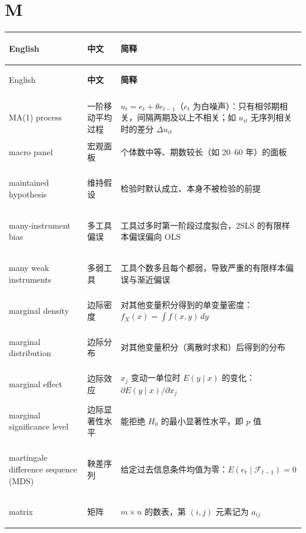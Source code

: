 \begingroup
\footnotesize
\setlength{\LTpre}{2pt}\setlength{\LTpost}{4pt}
\renewcommand{\arraystretch}{1.1}

\par{}\ifdim\dimexpr\pagegoal-\pagetotal\relax<16\baselineskip\newpage\fi
\section*{M}
\begin{longtable}{@{}>{\bfseries\boldmath\raggedright\arraybackslash}p{4.6cm}>{\raggedright\arraybackslash}p{3.2cm}>{\raggedright\arraybackslash}p{\dimexpr\textwidth-7.8cm-4\tabcolsep\relax}@{}}
\toprule
English & \textbf{中文} & \textbf{简释}\\
\midrule
\endfirsthead
\toprule
English & \textbf{中文} & \textbf{简释}\\
\midrule
\endhead
\midrule
\multicolumn{3}{r@{}}{\footnotesize\itshape （续下页）}\\
\endfoot
\bottomrule
\endlastfoot
MA(1) process & 一阶移动平均过程 & $u_t=e_t+\theta e_{t-1}$（$e_t$ 为白噪声）：只有相邻期相关，间隔两期及以上不相关；如 $u_{it}$ 无序列相关时的差分 $\Delta u_{it}$ \\
macro panel & 宏观面板 & 个体数中等、期数较长（如 20--60 年）的面板 \\
maintained hypothesis & 维持假设 & 检验时默认成立、本身不被检验的前提 \\
many-instrument bias & 多工具偏误 & 工具过多时第一阶段过度拟合，2SLS 的有限样本偏误偏向 OLS \\
many weak instruments & 多弱工具 & 工具个数多且每个都弱，导致严重的有限样本偏误与渐近偏误 \\
marginal density & 边际密度 & 对其他变量积分得到的单变量密度：$f_X(x)=\int f(x,y)\,dy$ \\
marginal distribution & 边际分布 & 对其他变量积分（离散时求和）后得到的分布 \\
marginal effect & 边际效应 & $x_j$ 变动一单位时 $E(y\mid x)$ 的变化：$\partial E(y\mid x)/\partial x_j$ \\
marginal significance level & 边际显著性水平 & 能拒绝 $H_0$ 的最小显著性水平，即 $p$ 值 \\
martingale difference sequence (MDS) & 鞅差序列 & 给定过去信息条件均值为零：$E(e_t\mid\mathcal F_{t-1})=0$ \\
matrix & 矩阵 & $m\times n$ 的数表，第 $(i,j)$ 元素记为 $a_{ij}$ \\

\end{longtable}
